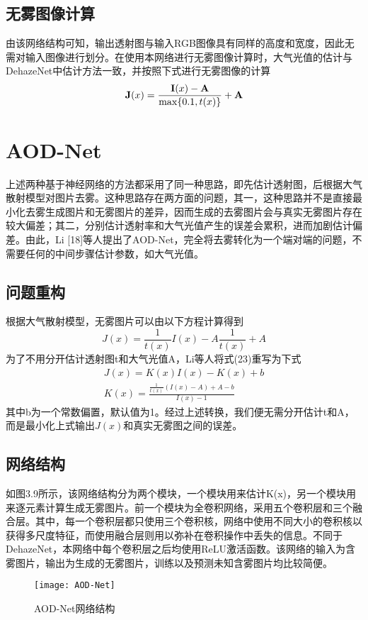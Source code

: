 \documentclass[a4paper, 12pt]{report}
\begin{document}
\subsection{无雾图像计算\quad}
	由该网络结构可知，输出透射图与输入RGB图像具有同样的高度和宽度，因此无需对输入图像进行划分。在使用本网络进行无雾图像计算时，大气光值的估计与DehazeNet中估计方法一致，并按照下式进行无雾图像的计算
\begin{equation}
{\bf J}(x) = \frac{{\bf I}(x) - {\bf A}}{\max\{0.1, t(x)\}} + {\bf A}
\end{equation}

\section{AOD-Net\quad}
上述两种基于神经网络的方法都采用了同一种思路，即先估计透射图，后根据大气散射模型对图片去雾。这种思路存在两方面的问题，其一，这种思路并不是直接最小化去雾生成图片和无雾图片的差异，因而生成的去雾图片会与真实无雾图片存在较大偏差；其二，分别估计透射率和大气光值产生的误差会累积，进而加剧估计偏差。由此，Li [18]等人提出了AOD-Net，完全将去雾转化为一个端对端的问题，不需要任何的中间步骤估计参数，如大气光值。

\subsection{问题重构\quad}
根据大气散射模型，无雾图片可以由以下方程计算得到
\begin{equation}
J(x) = \frac{1}{t(x)}I(x) - A\frac{1}{t(x)} + A
\end{equation}
为了不用分开估计透射图t和大气光值A，Li等人将式(23)重写为下式
\begin{equation}
\begin{aligned}
J(x) = K(x)I(x) - K(x) + b \\
K(x) = \frac{\frac{1}{t(x)}(I(x) - A) + A - b}{I(x) - 1}
\end{aligned}
\end{equation}
其中b为一个常数偏置，默认值为1。经过上述转换，我们便无需分开估计t和A，而是最小化上式输出$J(x)$和真实无雾图之间的误差。

\subsection{网络结构\quad}

如图3.9所示，该网络结构分为两个模块，一个模块用来估计K(x)，另一个模块用来逐元素计算生成无雾图片。前一个模块为全卷积网络，采用五个卷积层和三个融合层。其中，每一个卷积层都只使用三个卷积核，网络中使用不同大小的卷积核以获得多尺度特征，而使用融合层则用以弥补在卷积操作中丢失的信息。不同于DehazeNet，本网络中每个卷积层之后均使用ReLU激活函数。该网络的输入为含雾图片，输出为生成的无雾图片，训练以及预测未知含雾图片均比较简便。
\begin{figure}[H]
\centering
\texttt{[image: AOD-Net]}
\caption{AOD-Net网络结构}
\end{figure}
\end{document}
